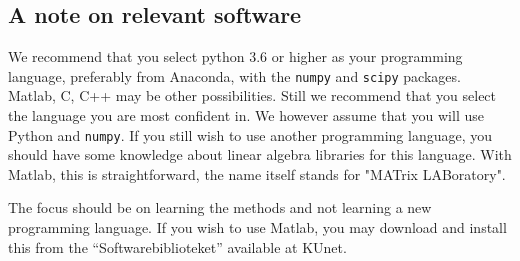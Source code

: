 \documentclass[a4paper,10pt]{article}
\newcommand{\numpy}{\texttt{numpy}}
\begin{document}
\subsection*{A note on relevant software}
We recommend that you select python 3.6 or higher as your programming
language, preferably from Anaconda, with the \texttt{numpy} and \texttt{scipy} packages.
Matlab, C,  C++ may be other possibilities. Still we recommend that you select the language you are  
most confident in. We however assume that you will use Python and \numpy. If you still wish to use another programming language, you should have some knowledge about linear algebra libraries for this language.
With Matlab, this is straightforward, the name itself stands for "MATrix LABoratory".

The focus should be on learning the methods and not 
learning a new programming language. If you wish to use Matlab, you may download and install this from the
``Softwarebiblioteket'' available at KUnet.


\medskip
\end{document}
